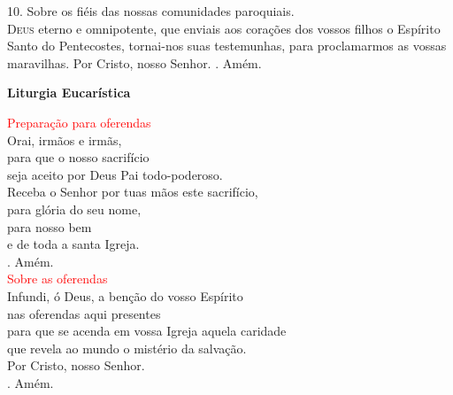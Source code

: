 \documentclass{book}
\begin{document}
\begin{flushleft}
    \vspace{.1cm}
    \newline
    {\color{red} 10.} Sobre os fiéis das nossas comunidades paroquiais.
    \vspace{.1cm} \\
    \lettrine[findent=2pt]{\color{red}D}{eus} eterno e omnipotente,
    \newline
    que enviais aos corações dos vossos filhos
    \newline
    o Espírito Santo do Pentecostes,
    \newline
    tornai-nos suas testemunhas,
    \newline
    para proclamarmos as vossas maravilhas.
    \newline
    Por Cristo, nosso Senhor.
    \newline
    {\color{red} \Rbar.} Amém.

\end{flushleft}

\begin{center}

    \textbf{Liturgia Eucarística}

\end{center}

\begin{flushleft}
    \textcolor{red}{Preparação para oferendas}
    \vspace{.2cm} \\
    Orai, irmãos e irmãs, \\
    para que o nosso sacrifício \\
    seja aceito por Deus Pai todo-poderoso.
    \vspace{.1cm} \\
    Receba o Senhor por tuas mãos este sacrifício, \\
    para glória do seu nome, \\
    para nosso bem \\
    e de toda a santa Igreja.
    \vspace{.1cm} \\
    {\color{red} \Rbar.} Amém.
    \vspace{.2cm} \\
    \textcolor{red}{Sobre as oferendas}
    \vspace{.2cm} \\
    Infundi, ó Deus, a benção do vosso Espírito \\
    nas oferendas aqui presentes \\
    para que se acenda em vossa Igreja aquela caridade \\
    que revela ao mundo o mistério da salvação. \\
    Por Cristo, nosso Senhor. \\
    {\color{red} \Rbar.} Amém.

\end{flushleft}
\end{document}
